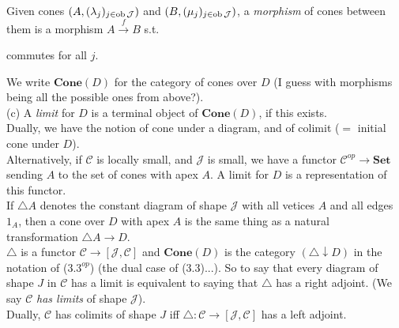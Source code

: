 \documentclass[a4paper]{article}
\begin{document}
\begin{defi}
    Given cones $(A,(\lambda_j)_{j \in \operatorname{ob} \mathcal{J}})$ and $(B,(\mu_j)_{j \in \operatorname{ob} \mathcal{J}})$, a \emph{morphism} of cones between them is a morphism $A \xrightarrow{f} B$ s.t.
    commutes for all $j$.

    We write $\mathbf{Cone}(D)$ for the category of cones over $D$ (I guess with morphisms being all the possible ones from above?).\\
    (c) A \emph{limit} for $D$ is a terminal object of $\mathbf{Cone}(D)$, if this exists.\\
    Dually, we have the notion of cone under a diagram, and of colimit ($=$ initial cone under $D$).\\
    Alternatively, if $\mathcal{C}$ is locally small, and $\mathcal{J}$ is small, we have a functor $\mathcal{C}^{op} \to \mathbf{Set}$ sending $A$ to the set of cones with apex $A$. A limit for $D$ is a representation of this functor.\\
    If $\triangle A$ denotes the constant diagram of shape $\mathcal{J}$ with all vetices $A$ and all edges $1_A$, then a cone over $D$ with apex $A$ is the same thing as a natural transformation $\triangle A \to D$.\\
    $\triangle$ is a functor $\mathcal{C} \to [\mathcal{J}, \mathcal{C}]$ and $\mathbf{Cone}(D)$ is the category $(\triangle \downarrow D)$ in the notation of ($3.3^{op}$) (the dual case of (3.3)...). So to say that every diagram of shape $J$ in $\mathcal{C}$ has a limit is equivalent to saying that $\triangle$ has a right adjoint. (We say $\mathcal{C}$ \emph{has limits} of shape $\mathcal{J}$).\\
    Dually, $\mathcal{C}$ has colimits of shape $J$ iff $\triangle:\mathcal{C} \to [\mathcal{J},\mathcal{C}]$ has a left adjoint.
\end{defi}
\end{document}
